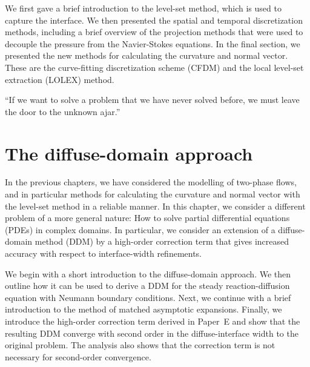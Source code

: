 \documentclass[11pt,b5paper,DIV=calc,BCOR1.3cm,headings=small,%
               footinclude=false,headsepline]{scrbook}
\begin{document}
We first gave a brief introduction to the level-set method, which is used to
capture the interface.  We then presented the spatial and temporal
discretization methods, including a brief overview of the projection methods
that were used to decouple the pressure from the Navier-Stokes equations.  In
the final section, we presented the new methods for calculating the curvature
and normal vector.  These are the curve-fitting discretization scheme (CFDM)
and the local level-set extraction (LOLEX) method.

\begin{savequote}[6cm]
  ``If we want to solve a problem that we have never solved before, we must
  leave the door to the unknown ajar.''
\end{savequote}
\chapter{The diffuse-domain approach}
\label{chap:diffuse-domain}
In the previous chapters, we have considered the modelling of two-phase flows,
and in particular methods for calculating the curvature and normal vector with
the level-set method in a reliable manner.  In this chapter, we consider
a different problem of a more general nature:  How to solve partial
differential equations (PDEs) in complex domains.  In particular, we consider
an extension of a diffuse-domain method (DDM) by a high-order correction term
that gives increased accuracy with respect to interface-width refinements.

We begin with a short introduction to the diffuse-domain approach.  We then
outline how it can be used to derive a DDM for the steady reaction-diffusion
equation with Neumann boundary conditions.  Next, we continue with a brief
introduction to the method of matched asymptotic expansions.  Finally, we
introduce the high-order correction term derived in Paper~E and show that the
resulting DDM converge with second order in the diffuse-interface width to the
original problem.  The analysis also shows that the correction term is not
necessary for second-order convergence.
\end{document}
